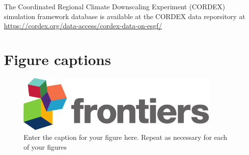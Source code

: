 \documentclass[utf8]{FrontiersinHarvard} %
\begin{document}
The Coordinated Regional Climate Downscaling Experiment (CORDEX) simulation framework database is available at the CORDEX data reporsitory at \url{https://cordex.org/data-access/cordex-data-on-esgf/}





\section*{Figure captions}


\begin{figure}[h!]
\begin{center}
\includegraphics[width=10cm]{logo1}%
\end{center}
\caption{ Enter the caption for your figure here.  Repeat as  necessary for each of your figures}\label{fig:1}
\end{figure}
\end{document}
